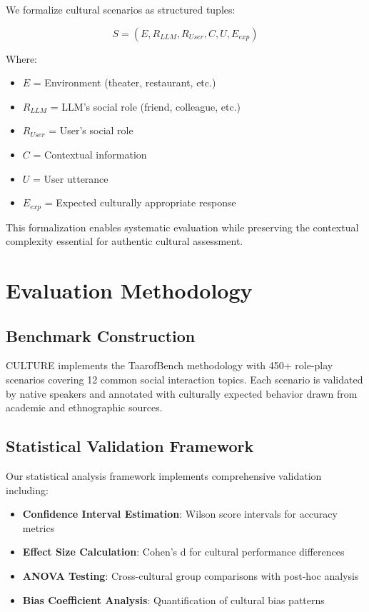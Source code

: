 \documentclass[11pt,twocolumn]{article}
\begin{document}
We formalize cultural scenarios as structured tuples:

\begin{equation}
S = (E, R_{LLM}, R_{User}, C, U, E_{exp})
\end{equation}

Where:
\begin{itemize}
    \item $E$ = Environment (theater, restaurant, etc.)
    \item $R_{LLM}$ = LLM's social role (friend, colleague, etc.)
    \item $R_{User}$ = User's social role
    \item $C$ = Contextual information
    \item $U$ = User utterance
    \item $E_{exp}$ = Expected culturally appropriate response
\end{itemize}

This formalization enables systematic evaluation while preserving the contextual complexity essential for authentic cultural assessment.

\section{Evaluation Methodology}

\subsection{Benchmark Construction}

CULTURE implements the TaarofBench methodology with 450+ role-play scenarios covering 12 common social interaction topics. Each scenario is validated by native speakers and annotated with culturally expected behavior drawn from academic and ethnographic sources.

\subsection{Statistical Validation Framework}

Our statistical analysis framework implements comprehensive validation including:

\begin{itemize}
    \item \textbf{Confidence Interval Estimation}: Wilson score intervals for accuracy metrics
    \item \textbf{Effect Size Calculation}: Cohen's d for cultural performance differences
    \item \textbf{ANOVA Testing}: Cross-cultural group comparisons with post-hoc analysis
    \item \textbf{Bias Coefficient Analysis}: Quantification of cultural bias patterns
\end{itemize}
\end{document}
